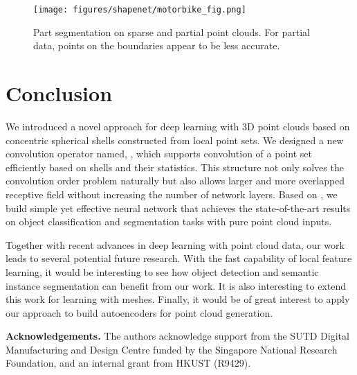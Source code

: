 \documentclass[10pt,twocolumn,letterpaper]{article}
\begin{document}
\begin{figure}[t]
	\centering
	\texttt{[image: figures/shapenet/motorbike\_fig.png]}
	\caption{Part segmentation on sparse and partial point clouds. For partial data, points on the boundaries appear to be less accurate.}
	\label{fig:motorbike}
\end{figure}

\section{Conclusion}
\label{conclusion}
We introduced a novel approach for deep learning with 3D point clouds based on concentric spherical shells constructed from local point sets. We designed a new convolution operator named, \ourconv, which supports convolution of a point set efficiently based on shells and their statistics. This structure not only solves the convolution order problem naturally but also allows larger and more overlapped receptive field without increasing the number of network layers. Based on \ourconv, we build simple yet effective neural network that achieves the state-of-the-art results on object classification and segmentation tasks with pure point cloud inputs.

Together with recent advances in deep learning with point cloud data, our work leads to several potential future research. With the fast capability of local feature learning, it would be interesting to see how object detection and semantic instance segmentation can benefit from our work. It is also interesting to extend this work for learning with meshes. 
Finally, it would be of great interest to apply our approach to build autoencoders for point cloud generation.

\noindent
\textbf{Acknowledgements.} The authors acknowledge support from the SUTD Digital Manufacturing and Design Centre  funded by the Singapore National Research Foundation, and an internal grant from HKUST (R9429).

{\small


}
\end{document}
